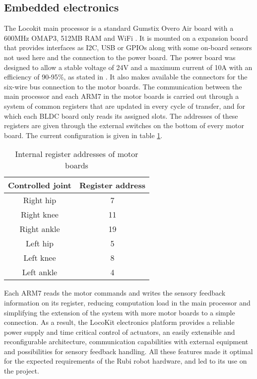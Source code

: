 
\subsection{Embedded electronics} %
\label{sub:locokit_electronics}
The Locokit main processor is a standard Gumstix Overo Air board with a 600MHz OMAP3, 512MB RAM and WiFi \cite{gumstix}.
It is mounted on a expansion board that provides interfaces as I2C, USB or GPIOs along with some on-board sensors not used here and the connection to the power board.
The power board was designed to allow a stable voltage of 24V and a maximum current of 10A with an efficiency of 90-95$\%$, as stated in \cite{locokit-electronics}.
It also makes available the connectors for the six-wire bus connection to the motor boards.
The communication between the main processor and each ARM7 in the motor boards is carried out through a system of common registers that are updated in every cycle of transfer, and for which each BLDC board only reads its assigned slots.
The addresses of these registers are given through the external switches on the bottom of every motor board.
The current configuration is given in table \ref{tab:motor_boards_addresses}.

\begin{table}
\begin{center}
\begin{tabular}{c | c}
  Controlled joint & Register address \\
  \hline
  Right hip & 7 \\
  Right knee & 11 \\
  Right ankle & 19 \\
  Left hip & 5 \\
  Left knee & 8\\
  Left ankle & 4 
\end{tabular}
\caption{Internal register addresses of motor boards}
\label{tab:motor_boards_addresses}
\end{center}
\end{table}

Each ARM7 reads the motor commands and writes the sensory feedback information on its register, reducing computation load in the main processor and simplifying the extension of the system with more motor boards to a simple connection.
As a result, the LocoKit electronics platform provides a reliable power supply and time critical control of actuators, an easily extensible and reconfigurable architecture, communication capabilities with external equipment and possibilities for sensory feedback handling.
All these features made it optimal for the expected requirements of the Rubi robot hardware, and led to its use on the project. 



